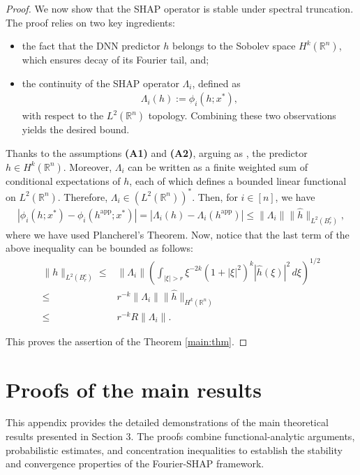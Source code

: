 \documentclass[letterpaper,11pt]{article}
\numberwithin{equation}{section}
\renewcommand{\leq}{\leqslant}
\numberwithin{equation}{section}
\begin{document}
\begin{proof}
    We now show that the SHAP operator is stable under spectral truncation. The proof relies on two key ingredients:
    \begin{itemize}
        \item[(i)] the fact that the DNN predictor $h$ belongs to the Sobolev space $H^k(\mathbb{R}^n)$, which ensures decay of its Fourier tail, and;
        \item[(ii)] the continuity of the SHAP operator $\Lambda_i$, defined as
        \begin{align*}
            \Lambda_i(h):=\phi_i(h;x^*),
        \end{align*}
        with respect to the $L^2(\mathbb{R}^n)$ topology. Combining these two observations yields the desired bound.
    \end{itemize}

    Thanks to the assumptions {\bf (A1)} and {\bf (A2)}, arguing as \cite{luo2019theory}, the predictor $h\in H^k(\mathbb{R}^n)$. Moreover, $\Lambda_i$ can be written as a finite weighted sum of conditional expectations of $h$, each of which defines a bounded linear functional on $L^2(\mathbb{R}^n)$. Therefore, $\Lambda_i\in (L^2(\mathbb{R}^n))^*$. Then, for $i\in [n]$, we have 
    \begin{align*}
        |\phi_i(h;x^*)-\phi_i(h^{\text{app}};x^*)|=|\Lambda_i(h)-\Lambda_i(h^{\text{app}})|\leq \|\Lambda_i\| \|\hat{h}\|_{L^2(B_r^c)},
    \end{align*}
    where we have used Plancherel's Theorem. Now, notice that the last term of the above inequality can be bounded as follows: 
    \begin{align*}
        \|h\|_{L^2(B_r^c)}\leq &\|\Lambda_i\| \left(\int_{|\xi|>r} \xi^{-2k}(1+|\xi|^2)^k |\hat{h}(\xi)|^2\,d\xi \right)^{1/2}\\
        \leq &r^{-k} \|\Lambda_i\|  \|\hat{h}\|_{H^k(\mathbb{R}^n)}\\
        \leq & r^{-k} R \|\Lambda_i\|.
    \end{align*}

This proves the assertion of the Theorem \ref{main:thm}.    
\end{proof}

\section{Proofs of the main results}
\label{section:proof:of:second:main:result}

This appendix provides the detailed demonstrations of the main theoretical results presented in Section 3. The proofs combine functional-analytic arguments, probabilistic estimates, and concentration inequalities to establish the stability and convergence properties of the Fourier-SHAP framework.
\end{document}
